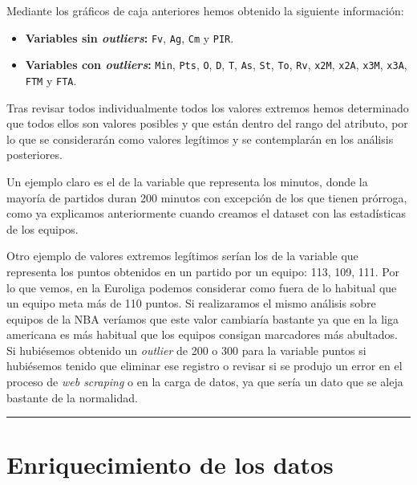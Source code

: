 \documentclass[
]{article}
\providecommand{\tightlist}{%
  \setlength{\itemsep}{0pt}\setlength{\parskip}{0pt}}
\begin{document}
\newpage

Mediante los gráficos de caja anteriores hemos obtenido la siguiente
información:

\begin{itemize}
\tightlist
\item
  \textbf{Variables sin \emph{outliers}:} \texttt{Fv}, \texttt{Ag},
  \texttt{Cm} y \texttt{PIR}.
\item
  \textbf{Variables con \emph{outliers}:} \texttt{Min}, \texttt{Pts},
  \texttt{O}, \texttt{D}, \texttt{T}, \texttt{As}, \texttt{St},
  \texttt{To}, \texttt{Rv}, \texttt{x2M}, \texttt{x2A}, \texttt{x3M},
  \texttt{x3A}, \texttt{FTM} y \texttt{FTA}.
\end{itemize}

Tras revisar todos individualmente todos los valores extremos hemos
determinado que todos ellos son valores posibles y que están dentro del
rango del atributo, por lo que se considerarán como valores legítimos y
se contemplarán en los análisis posteriores.

Un ejemplo claro es el de la variable que representa los minutos, donde
la mayoría de partidos duran 200 minutos con excepción de los que tienen
prórroga, como ya explicamos anteriormente cuando creamos el dataset con
las estadísticas de los equipos.

Otro ejemplo de valores extremos legítimos serían los de la variable que
representa los puntos obtenidos en un partido por un equipo: 113, 109,
111. Por lo que vemos, en la Euroliga podemos considerar como fuera de
lo habitual que un equipo meta más de 110 puntos. Si realizaramos el
mismo análisis sobre equipos de la NBA veríamos que este valor cambiaría
bastante ya que en la liga americana es más habitual que los equipos
consigan marcadores más abultados. Si hubiésemos obtenido un
\emph{outlier} de 200 o 300 para la variable puntos si hubiésemos tenido
que eliminar ese registro o revisar si se produjo un error en el proceso
de \emph{web scraping} o en la carga de datos, ya que sería un dato que
se aleja bastante de la normalidad.

\begin{center}\rule{0.5\linewidth}{0.5pt}\end{center}

\newpage

\hypertarget{enriquecimiento-de-los-datos}{%
\section{Enriquecimiento de los
datos}\label{enriquecimiento-de-los-datos}}
\end{document}
